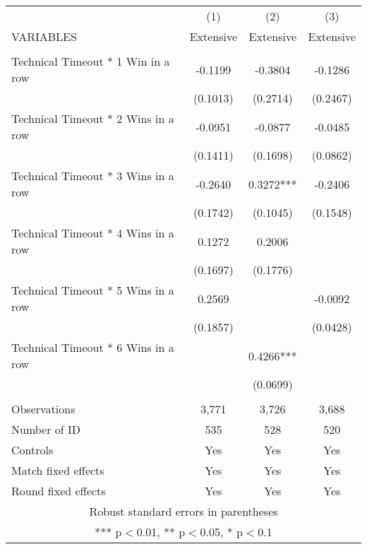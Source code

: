\documentclass[]{article}
\begin{document}
\begin{tabular}{lccc} \hline
 & (1) & (2) & (3) \\
VARIABLES & Extensive & Extensive & Extensive \\ \hline
 &  &  &  \\
Technical Timeout * 1 Win in a row & -0.1199 & -0.3804 & -0.1286 \\
 & (0.1013) & (0.2714) & (0.2467) \\
Technical Timeout * 2 Wins in a row & -0.0951 & -0.0877 & -0.0485 \\
 & (0.1411) & (0.1698) & (0.0862) \\
Technical Timeout * 3 Wins in a row & -0.2640 & 0.3272*** & -0.2406 \\
 & (0.1742) & (0.1045) & (0.1548) \\
Technical Timeout * 4 Wins in a row & 0.1272 & 0.2006 &  \\
 & (0.1697) & (0.1776) &  \\
Technical Timeout * 5 Wins in a row & 0.2569 &  & -0.0092 \\
 & (0.1857) &  & (0.0428) \\
Technical Timeout * 6 Wins in a row &  & 0.4266*** &  \\
 &  & (0.0699) &  \\
 &  &  &  \\
Observations & 3,771 & 3,726 & 3,688 \\
Number of ID & 535 & 528 & 520 \\
Controls & Yes & Yes & Yes \\
Match fixed effects & Yes & Yes & Yes \\
 Round fixed effects & Yes & Yes & Yes \\ \hline
\multicolumn{4}{c}{ Robust standard errors in parentheses} \\
\multicolumn{4}{c}{ *** p$<$0.01, ** p$<$0.05, * p$<$0.1} \\
\end{tabular}
\end{document}

